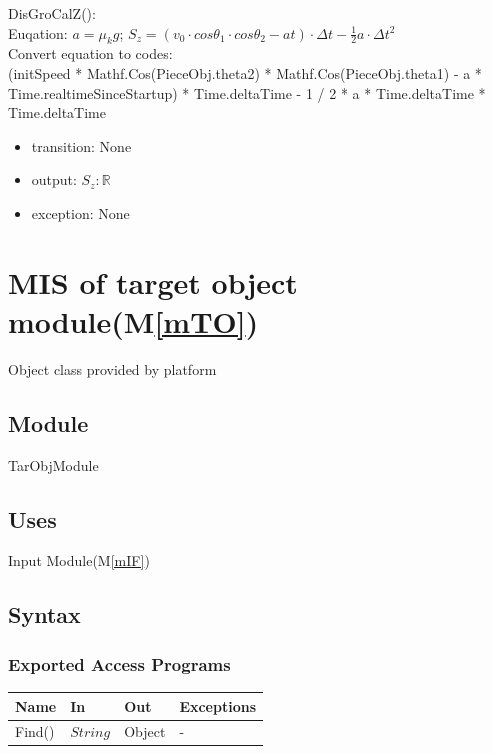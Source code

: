 \documentclass[12pt, titlepage]{article}
\newcommand{\mref}[1]{M\ref{#1}}
\begin{document}
\noindent DisGroCalZ():\\
Euqation: $a=\mu_{k}g$; $S_{z}=(v_{0}\cdot cos\theta _{1}\cdot cos\theta _{2} - at)\cdot \Delta t-\frac{1}{2}a \cdot \Delta t^{2}$\\
Convert equation to codes:\\
(initSpeed * Mathf.Cos(PieceObj.theta2) * Mathf.Cos(PieceObj.theta1) - a * Time.realtimeSinceStartup) * Time.deltaTime - 1 / 2 * a * Time.deltaTime * Time.deltaTime
\begin{itemize}
	\item transition: None
	\item output: $S_{z}: \mathbb{R}$ 
	\item exception: None 
\end{itemize}

\section{MIS of target object module(\mref{mTO})}

Object class provided by platform

\subsection{Module}

TarObjModule

\subsection{Uses}

Input Module(\mref{mIF})

\subsection{Syntax}

\subsubsection{Exported Access Programs}

\begin{center}
	\begin{tabular}{p{2cm} p{4cm} p{4cm} p{2cm}}
		\hline
		\textbf{Name} & \textbf{In} & \textbf{Out} & \textbf{Exceptions} \\
		\hline
		Find() & $String$ & Object & - \\
		\hline		
	\end{tabular}
\end{center}
\end{document}
